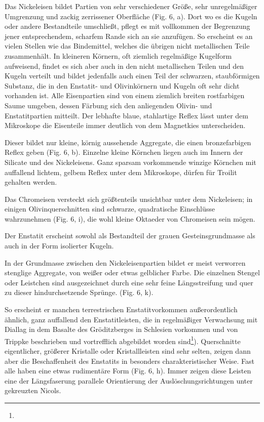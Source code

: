 \documentclass[a4paper, 11pt, oneside]{article}
\begin{document}
Das Nickeleisen bildet Partien von sehr verschiedener Größe, sehr unregelmäßiger Umgrenzung und zackig zerrissener Oberfläche (Fig. 6, a). Dort wo es die Kugeln oder andere Bestandteile umschließt, pflegt es mit vollkommen der Begrenzung jener entsprechendem, scharfem Rande sich an sie anzufügen. So erscheint es an vielen Stellen wie das Bindemittel, welches die übrigen nicht metallischen Teile zusammenhält. In kleineren Körnern, oft ziemlich regelmäßige Kugelform aufweisend, findet es sich aber auch in den nicht metallischen Teilen und den Kugeln verteilt und bildet jedenfalls auch einen Teil der schwarzen, staubförmigen Substanz, die in den Enstatit- und Olivinkörnern und Kugeln oft sehr dicht vorhanden ist. Alle Eisenpartien sind von einem ziemlich breiten rostfarbigen Saume umgeben, dessen Färbung sich den anliegenden Olivin- und Enstatitpartien mitteilt. Der lebhafte blaue, stahlartige Reflex lässt unter dem Mikroskope die Eisenteile immer deutlich von dem Magnetkies unterscheiden.

Dieser bildet nur kleine, körnig aussehende Aggregate, die einen bronzefarbigen Reflex geben (Fig. 6, b). Einzelne kleine Körnchen liegen auch im Innern der Silicate und des Nickeleisens. Ganz sparsam vorkommende winzige Körnchen mit auffallend lichtem, gelbem Reflex unter dem Mikroskope, dürfen für Troilit gehalten werden.

Das Chromeisen versteckt sich größtenteils unsichtbar unter dem Nickeleisen; in einigen Olivinquerschnitten sind schwarze, quadratische Einschlüsse wahrzunehmen (Fig. 6, i), die wohl kleine Oktaeder von Chromeisen sein mögen.

Der Enstatit erscheint sowohl als Bestandteil der grauen Gesteinsgrundmasse als auch in der Form isolierter Kugeln.

In der Grundmasse zwischen den Nickeleisenpartien bildet er meist verworren stenglige Aggregate, von weißer oder etwas gelblicher Farbe. Die einzelnen Stengel oder Leistchen sind ausgezeichnet durch eine sehr feine Längsstreifung und quer zu dieser hindurchsetzende Sprünge. (Fig. 6, k).

So erscheint er manchen terrestrischen Enstatitvorkommen außerordentlich ähnlich, ganz auffallend den Enstatitleisten, die in regelmäßiger Verwachsung mit Diallag in dem Basalte des Gröditzberges in Schlesien vorkommen und von Trippke beschrieben und vortrefflich abgebildet worden sind\footnote{}). Querschnitte eigentlicher, größerer Kristalle oder Kristallleisten sind sehr selten, zeigen dann aber die Beschaffenheit des Enstatits in besonders charakteristischer Weise. Fast alle haben eine etwas rudimentäre Form (Fig. 6, h). Immer zeigen diese Leisten eine der Längsfaserung parallele Orientierung der Auslöschungsrichtungen unter gekreuzten Nicols.
\end{document}
